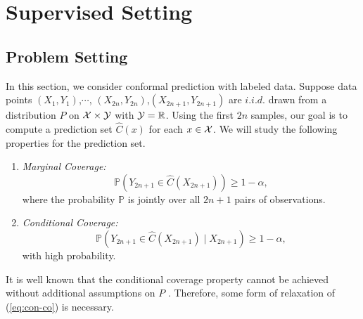 \section{Supervised Setting}\label{sec:labeled}


\subsection{Problem Setting}

In this section, we consider conformal prediction with labeled data. Suppose data points $(X_1,Y_1)$,$\cdots$, $(X_{2n},Y_{2n})$,$(X_{2n+1},Y_{2n+1})$ are $i.i.d.$ drawn from a distribution $P$ on $\mathcal{X} \times \mathcal{Y}$ with $\mathcal{Y} = \mathbb{R}$. Using the first $2n$ samples, our goal is to compute a prediction set $\widehat{C}(x)$ for each $x \in \mathcal{X}$. We will study the following properties for the prediction set.
\begin{enumerate}
\item \textit{Marginal Coverage:}
$$
\mathbb{P}\left(Y_{2n+1} \in \widehat{C}(X_{2n+1})\right)\geq 1-\alpha,
$$
where the probability $\mathbb{P}$ is jointly over all $2n+1$ pairs of observations.
\item \textit{Conditional Coverage:}
\begin{equation}
\mathbb{P}\left(Y_{2n+1}\in \widehat{C}(X_{2n+1}) \mid X_{2n+1}\right)\geq 1-\alpha, \label{eq:con-co}
\end{equation}
with high probability.
\end{enumerate}
It is well known that the conditional coverage property cannot be achieved without additional assumptions on $P$ \citep{vovk2012conditional,lei2014distribution,foygel2021limits}. Therefore, some form of relaxation of (\ref{eq:con-co}) is necessary.

